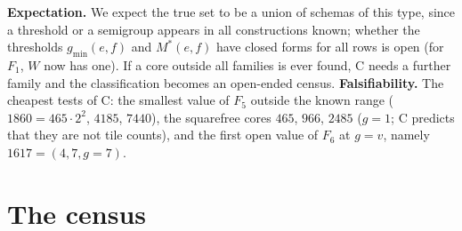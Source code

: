 \documentclass[11pt,reqno]{amsart}
\theoremstyle{plain}
\theoremstyle{definition}
\begin{document}
\textbf{Expectation.} We expect the true set to be a union of schemas of this type, since a threshold or a semigroup appears in all constructions known; whether the thresholds $g_{\min}(e,f)$ and $M^*(e,f)$ have closed forms for all rows is open (for $F_1$, $W$ now has one).
If a core outside all families is ever found, C needs a further family and the classification becomes an open-ended census.
\textbf{Falsifiability.} The cheapest tests of C: the smallest value of $F_5$ outside the known range ($1860=465\cdot2^2$, $4185$, $7440$), the squarefree cores $465$, $966$, $2485$ ($g=1$; C predicts that they are not tile counts), and the first open value of $F_6$ at $g=v$, namely $1617=(4,7,g=7)$.

\section{The census}\label{sec:census}
\end{document}
